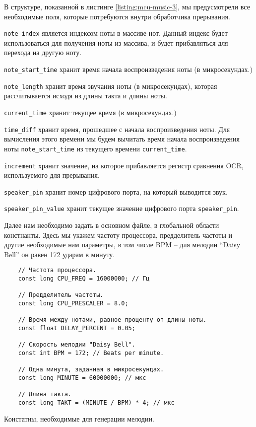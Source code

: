 \documentclass[../sparc.tex]{subfiles}
\begin{document}
В структуре, показанной в листинге \ref{listing:mcu-music-3}, мы предусмотрели
все необходимые поля, которые потребуются внутри обработчика прерывания.

\texttt{note_index} является индексом ноты в массиве нот.  Данный
индекс будет использоваться для получения ноты из массива, и будет прибавляться
для перехода на другую ноту.

\texttt{note_start_time} хранит время начала воспроизведения ноты (в
микросекундах.)

\texttt{note_length} хранит время звучания ноты (в микросекундах),
которая рассчитывается исходя из длины такта и длины ноты.

\texttt{current_time} хранит текущее время (в микросекундах.)

\texttt{time_diff} хранит время, прошедшее с начала воспроизведения
ноты.  Для вычисления этого времени мы будем вычитать время начала
воспроизведения ноты \texttt{note_start_time} из текущего времени
\texttt{current_time}.

\texttt{increment} хранит значение, на которое прибавляется регистр
сравнения OCR, используемого для прерывания.

\texttt{speaker_pin} хранит номер цифрового порта, на который выводится
звук.

\texttt{speaker_pin_value} хранит текущее значение цифрового порта
\texttt{speaker_pin}.

Далее нам необходимо задать в основном файле, в глобальной области констнанты.
Здесь мы укажем частоту процессора, предделитель частоты и другие необходимые
нам параметры, в том числе \gls{BPM} -- для мелодии ``Daisy Bell'' он равен 172
ударам в минуту.

\begin{listing}[H]
  \begin{verbatim}
    // Частота процессора.
    const long CPU_FREQ = 16000000; // Гц

    // Предделитель частоты.
    const long CPU_PRESCALER = 8.0;

    // Время между нотами, равное проценту от длины ноты.
    const float DELAY_PERCENT = 0.05;

    // Скорость мелодии "Daisy Bell".
    const int BPM = 172; // Beats per minute.

    // Одна минута, заданная в микросекундах.
    const long MINUTE = 60000000; // мкс

    // Длина такта.
    const long TAKT = (MINUTE / BPM) * 4; // мкс
  \end{verbatim}
  \caption{Констатны, необходимые для генерации мелодии.}
  \label{listing:mcu-music-4}
\end{listing}
\end{document}
